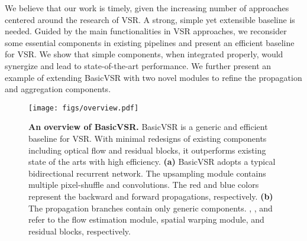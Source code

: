 \documentclass[final]{cvpr}
\begin{document}
We believe that our work is timely, given the increasing number of approaches centered around the research of VSR. A strong, simple yet extensible baseline is needed.
Guided by the main functionalities in VSR approaches, we reconsider some essential components in existing pipelines and present an efficient baseline for VSR. We show that simple components, when integrated properly, would synergize and lead to state-of-the-art performance.
We further present an example of extending \mbox{BasicVSR} with two novel modules to refine the propagation and aggregation components.
 \begin{figure*}[!t]
	\begin{center}
		\texttt{[image: figs/overview.pdf]}\vspace{0.1cm}
		\caption{\textbf{An overview of \mbox{BasicVSR}.} \mbox{BasicVSR} is a generic and efficient baseline for VSR. With minimal redesigns of existing components including optical flow and residual blocks, it outperforms existing state of the arts with high efficiency. \textbf{(a)} \mbox{BasicVSR} adopts a typical bidirectional recurrent network. The upsampling module  contains multiple pixel-shuffle and convolutions. The red and blue colors represent the backward and forward propagations, respectively. \textbf{(b)} The propagation branches contain only generic components. , , and  refer to the flow estimation module, spatial warping module, and residual blocks, respectively.}
		\vspace{-0.5cm}
		\label{fig:overview}
	\end{center}
\end{figure*}
\end{document}

